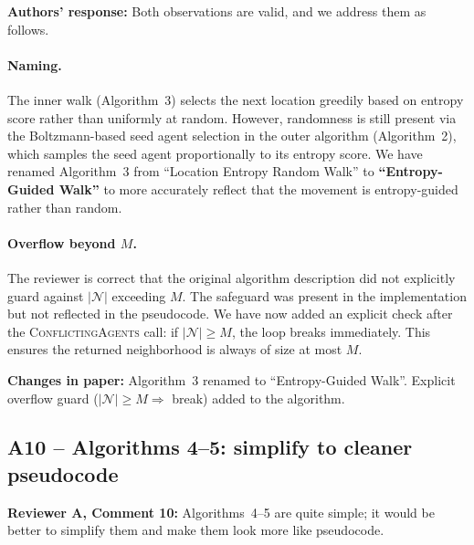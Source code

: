 \documentclass[review]{jair}
\begin{document}
\begin{authorbox}
\textbf{Authors' response:} Both observations are valid, and we address them as follows.

\paragraph{Naming.} The inner walk (Algorithm~3) selects the next location greedily based on entropy score rather than uniformly at random. However, randomness is still present via the Boltzmann-based seed agent selection in the outer algorithm (Algorithm~2), which samples the seed agent proportionally to its entropy score. We have renamed Algorithm~3 from ``Location Entropy Random Walk'' to \textbf{``Entropy-Guided Walk''} to more accurately reflect that the movement is entropy-guided rather than random.

\paragraph{Overflow beyond $M$.} The reviewer is correct that the original algorithm description did not explicitly guard against $|\mathcal{N}|$ exceeding $M$. The safeguard was present in the implementation but not reflected in the pseudocode. We have now added an explicit check after the \textsc{ConflictingAgents} call: if $|\mathcal{N}| \geq M$, the loop breaks immediately. This ensures the returned neighborhood is always of size at most $M$.
\end{authorbox}

\begin{changebox}
\textbf{Changes in paper:} Algorithm~3 renamed to ``Entropy-Guided Walk''. Explicit overflow guard ($|\mathcal{N}| \geq M \Rightarrow$ break) added to the algorithm.
\end{changebox}

\subsection*{A10 -- Algorithms 4--5: simplify to cleaner pseudocode}

\begin{reviewerbox}
\textbf{Reviewer A, Comment 10:} Algorithms~4--5 are quite simple; it would be better to simplify them and make them look more like pseudocode.
\end{reviewerbox}
\end{document}
